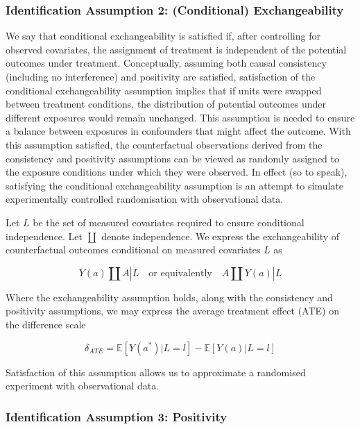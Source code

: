 \documentclass[
  singlecolumn]{article}
\begin{document}
\hypertarget{identification-assumption-2-conditional-exchangeability}{%
\subsubsection{Identification Assumption 2: (Conditional)
Exchangeability}\label{identification-assumption-2-conditional-exchangeability}}

We say that conditional exchangeability is satisfied if, after
controlling for observed covariates, the assignment of treatment is
independent of the potential outcomes under treatment. Conceptually,
assuming both causal consistency (including no interference) and
positivity are satisfied, satisfaction of the conditional
exchangeability assumption implies that if units were swapped between
treatment conditions, the distribution of potential outcomes under
different exposures would remain unchanged. This assumption is needed to
ensure a balance between exposures in confounders that might affect the
outcome. With this assumption satisfied, the counterfactual observations
derived from the consistency and positivity assumptions can be viewed as
randomly assigned to the exposure conditions under which they were
observed. In effect (so to speak), satisfying the conditional
exchangeability assumption is an attempt to simulate experimentally
controlled randomisation with observational data.

Let \(L\) be the set of measured covariates required to ensure
conditional independence. Let \(\coprod\) denote independence. We
express the exchangeability of counterfactual outcomes conditional on
measured covariates \(L\) as

\[
Y(a) \coprod  A|L \quad \text{or equivalently} \quad A \coprod  Y(a)|L
\]

Where the exchangeability assumption holds, along with the consistency
and positivity assumptions, we may express the average treatment effect
(ATE) on the difference scale

\[
\delta_{ATE}  = \mathbb{E}[Y(a^*)|L = l] - \mathbb{E}[Y(a)|L = l]
\]

Satisfaction of this assumption allows us to approximate a randomised
experiment with observational data.

\hypertarget{identification-assumption-3-positivity}{%
\subsubsection{Identification Assumption 3:
Positivity}\label{identification-assumption-3-positivity}}
\end{document}
